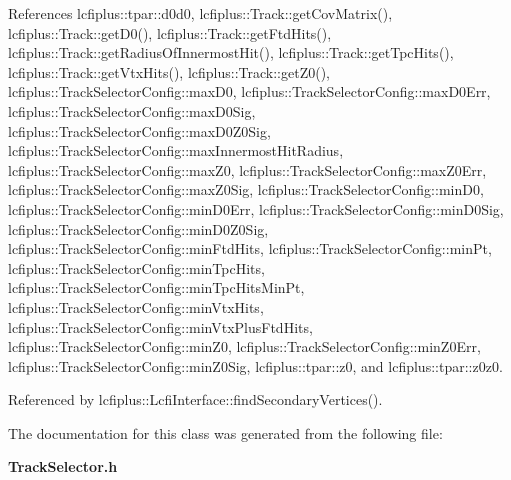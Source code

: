 References lcfiplus\-::tpar\-::d0d0, lcfiplus\-::\-Track\-::get\-Cov\-Matrix(), lcfiplus\-::\-Track\-::get\-D0(), lcfiplus\-::\-Track\-::get\-Ftd\-Hits(), lcfiplus\-::\-Track\-::get\-Radius\-Of\-Innermost\-Hit(), lcfiplus\-::\-Track\-::get\-Tpc\-Hits(), lcfiplus\-::\-Track\-::get\-Vtx\-Hits(), lcfiplus\-::\-Track\-::get\-Z0(), lcfiplus\-::\-Track\-Selector\-Config\-::max\-D0, lcfiplus\-::\-Track\-Selector\-Config\-::max\-D0\-Err, lcfiplus\-::\-Track\-Selector\-Config\-::max\-D0\-Sig, lcfiplus\-::\-Track\-Selector\-Config\-::max\-D0\-Z0\-Sig, lcfiplus\-::\-Track\-Selector\-Config\-::max\-Innermost\-Hit\-Radius, lcfiplus\-::\-Track\-Selector\-Config\-::max\-Z0, lcfiplus\-::\-Track\-Selector\-Config\-::max\-Z0\-Err, lcfiplus\-::\-Track\-Selector\-Config\-::max\-Z0\-Sig, lcfiplus\-::\-Track\-Selector\-Config\-::min\-D0, lcfiplus\-::\-Track\-Selector\-Config\-::min\-D0\-Err, lcfiplus\-::\-Track\-Selector\-Config\-::min\-D0\-Sig, lcfiplus\-::\-Track\-Selector\-Config\-::min\-D0\-Z0\-Sig, lcfiplus\-::\-Track\-Selector\-Config\-::min\-Ftd\-Hits, lcfiplus\-::\-Track\-Selector\-Config\-::min\-Pt, lcfiplus\-::\-Track\-Selector\-Config\-::min\-Tpc\-Hits, lcfiplus\-::\-Track\-Selector\-Config\-::min\-Tpc\-Hits\-Min\-Pt, lcfiplus\-::\-Track\-Selector\-Config\-::min\-Vtx\-Hits, lcfiplus\-::\-Track\-Selector\-Config\-::min\-Vtx\-Plus\-Ftd\-Hits, lcfiplus\-::\-Track\-Selector\-Config\-::min\-Z0, lcfiplus\-::\-Track\-Selector\-Config\-::min\-Z0\-Err, lcfiplus\-::\-Track\-Selector\-Config\-::min\-Z0\-Sig, lcfiplus\-::tpar\-::z0, and lcfiplus\-::tpar\-::z0z0.



Referenced by lcfiplus\-::\-Lcfi\-Interface\-::find\-Secondary\-Vertices().



The documentation for this class was generated from the following file\-:\begin{DoxyCompactItemize}
\item 
{\bf Track\-Selector.\-h}\end{DoxyCompactItemize}
